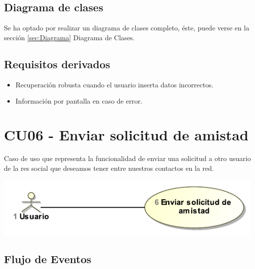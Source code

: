 \documentclass[12pt, a4paper, titlepage]{article}
\begin{document}
\subsection{Diagrama de clases}
Se ha optado por realizar un diagrama de clases completo, éste, puede verse en la sección \ref{sec:Diagrama} Diagrama de Clases.
\subsection{Requisitos derivados}

\begin{itemize}
	\item Recuperación robusta cuando el usuario inserta datos incorrectos.
	\item Información por pantalla en caso de error.
\end{itemize}

\section{CU06 - Enviar solicitud de amistad}

Caso de uso que representa la funcionalidad de enviar una solicitud a otro usuario de la res social que deseamos tener entre nuestros contactos en la red.

\begin{center}
	\includegraphics{Imagenes/EnviarSolicitudAmistadCU.pdf}
\end{center}

\subsection{Flujo de Eventos}
\end{document}
